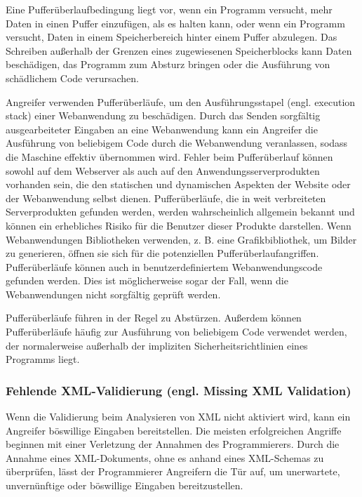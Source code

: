 Eine Pufferüberlaufbedingung liegt vor, wenn ein Programm versucht, mehr Daten in einen Puffer einzufügen, als es halten kann, oder wenn ein Programm versucht, Daten in einem Speicherbereich hinter einem Puffer abzulegen. Das Schreiben außerhalb der Grenzen eines zugewiesenen Speicherblocks kann Daten beschädigen, das Programm zum Absturz bringen oder die Ausführung von schädlichem Code verursachen. 

Angreifer verwenden Pufferüberläufe, um den Ausführungsstapel (engl. execution stack) einer Webanwendung zu beschädigen. Durch das Senden sorgfältig ausgearbeiteter Eingaben an eine Webanwendung kann ein Angreifer die Ausführung von beliebigem Code durch die Webanwendung veranlassen, sodass die Maschine effektiv übernommen wird. Fehler beim Pufferüberlauf können sowohl auf dem Webserver als auch auf den Anwendungsserverprodukten vorhanden sein, die den statischen und dynamischen Aspekten der Website oder der Webanwendung selbst dienen. Pufferüberläufe, die in weit verbreiteten Serverprodukten gefunden werden, werden wahrscheinlich allgemein bekannt und können ein erhebliches Risiko für die Benutzer dieser Produkte darstellen. Wenn Webanwendungen Bibliotheken verwenden, z. B. eine Grafikbibliothek, um Bilder zu generieren, öffnen sie sich für die potenziellen Pufferüberlaufangriffen. Pufferüberläufe können auch in benutzerdefiniertem Webanwendungscode gefunden werden. Dies ist möglicherweise sogar der Fall, wenn die Webanwendungen nicht sorgfältig geprüft werden. 

Pufferüberläufe führen in der Regel zu Abstürzen. Außerdem können Pufferüberläufe häufig zur Ausführung von beliebigem Code verwendet werden, der normalerweise außerhalb der impliziten Sicherheitsrichtlinien eines Programms liegt\cite{bufferoverflow16}.\\

\subsubsection{Fehlende XML-Validierung (engl. Missing XML Validation)}

Wenn die Validierung beim Analysieren von XML nicht aktiviert wird, kann ein Angreifer böswillige Eingaben bereitstellen. Die meisten erfolgreichen Angriffe beginnen mit einer Verletzung der Annahmen des Programmierers. Durch die Annahme eines XML-Dokuments, ohne es anhand eines XML-Schemas zu überprüfen, lässt der Programmierer Angreifern die Tür auf, um unerwartete, unvernünftige oder böswillige Eingaben bereitzustellen\cite{bufferoverflow16}.\\ 


